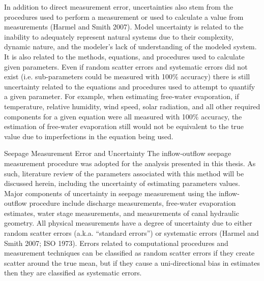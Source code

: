 \begin{linenumbers}
In addition to direct measurement error, uncertainties also stem from the procedures used to perform a measurement or used to calculate a value from measurements (Harmel and Smith 2007).  Model uncertainty is related to the inability to adequately represent natural systems due to their complexity, dynamic nature, and the modeler's lack of understanding of the modeled system.  It is also related to the methods, equations, and procedures used to calculate given parameters.  Even if random scatter errors and systematic errors did not exist (i.e. sub-parameters could be measured with 100\% accuracy) there is still uncertainty related to the equations and procedures used to attempt to quantify a given parameter.  For example, when estimating free-water evaporation, if temperature, relative humidity, wind speed, solar radiation, and all other required components for a given equation were all measured with 100\% accuracy, the estimation of free-water evaporation still would not be equivalent to the true value due to imperfections in the equation being used.


Seepage Measurement Error and Uncertainty
The inflow-outflow seepage measurement procedure was adopted for the analysis presented in this thesis.  As such, literature review of the parameters associated with this method will be discussed herein, including the uncertainty of estimating parameters values.  Major components of uncertainty in seepage measurement using the inflow-outflow procedure include discharge measurements, free-water evaporation estimates, water stage measurements, and measurements of canal hydraulic geometry.
All physical measurements have a degree of uncertainty due to either random scatter errors (a.k.a. “standard errors”) or systematic errors (Harmel and Smith 2007; ISO 1973).  Errors related to computational procedures and measurement techniques can be classified as random scatter errors if they create scatter around the true mean, but if they cause a uni-directional bias in estimates then they are classified as systematic errors.

  



\end{linenumbers}
